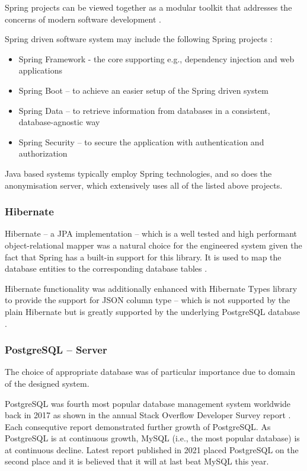 \documentclass[a4paper,twoside,12pt]{book}
\begin{document}
Spring projects can be viewed together as a modular toolkit that addresses the concerns of modern software development \cite{bib:spring_in_action}.

Spring driven software system may include the following Spring projects \cite{bib:spring_docs}:
\begin{itemize}
\item Spring Framework - the core supporting e.g., dependency injection and web applications
\item Spring Boot – to achieve an easier setup of the Spring driven system
\item Spring Data – to retrieve information from databases in a consistent, database-agnostic way
\item Spring Security – to secure the application with authentication and authorization
\end{itemize}

Java based systems typically employ Spring technologies, and so does the anonymisation server, which extensively uses all of the listed above projects. 

\subsubsection{Hibernate}

Hibernate – a JPA implementation – which is a well tested and high performant \cite{bib:hibernate_high_performance} object-relational mapper was a natural choice for the engineered system given the fact that Spring has a built-in support for this library. It is used to map the database entities to the corresponding database tables \cite{bib:hibernate_docs}.

Hibernate functionality was additionally enhanced with Hibernate Types library \cite{bib:hibernate_types} to provide the support for JSON column type – which is not supported by the plain Hibernate but is greatly supported by the underlying PostgreSQL database \cite{bib:postgresql_json}.

\subsubsection{PostgreSQL – Server}

The choice of appropriate database was of particular importance due to domain of the designed system.

PostgreSQL was fourth most popular database management system worldwide back in 2017 as shown in the annual Stack Overflow Developer Survey report \cite{bib:stackoverflow2017}. Each consequtive report demonstrated further growth of PostgreSQL. As PostgreSQL is at continuous growth, MySQL (i.e., the most popular database) is at continuous decline. Latest report published in 2021 \cite{bib:stackoverflow2021} placed PostgreSQL on the second place and it is believed that it will at last beat MySQL this year.
\end{document}
